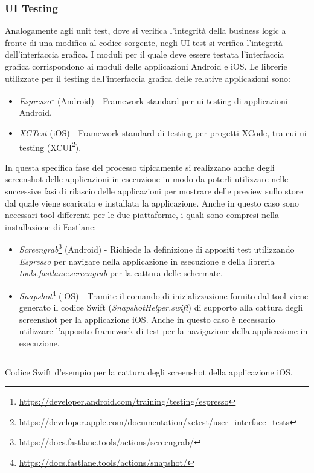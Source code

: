 \subsubsection{UI Testing}
Analogamente agli unit test, dove si verifica l'integrità della business logic a fronte di una modifica al codice sorgente, negli UI test si verifica l'integrità dell'interfaccia grafica. I moduli per il quale deve essere testata l'interfaccia grafica corrispondono ai moduli delle applicazioni Android e iOS. Le librerie utilizzate per il testing dell'interfaccia grafica delle relative applicazioni sono:
\begin{itemize}
    \item \textit{Espresso}\footnote{\url{https://developer.android.com/training/testing/espresso}} (Android) - Framework standard per ui testing di applicazioni Android.
    \item \textit{XCTest} (iOS) - Framework standard di testing per progetti XCode, tra cui ui testing (XCUI\footnote{\url{https://developer.apple.com/documentation/xctest/user_interface_tests}}).
\end{itemize}
In questa specifica fase del processo tipicamente si realizzano anche degli screenshot delle applicazioni in esecuzione in modo da poterli utilizzare nelle successive fasi di rilascio delle applicazioni per mostrare delle preview sullo store dal quale viene scaricata e installata la applicazione. Anche in questo caso sono necessari tool differenti per le due piattaforme, i quali sono compresi nella installazione di Fastlane:
\begin{itemize}
    \item \textit{Screengrab}\footnote{\url{https://docs.fastlane.tools/actions/screengrab/}} (Android) - Richiede la definizione di appositi test utilizzando \textit{Espresso} per navigare nella applicazione in esecuzione e della libreria \textit{tools.fastlane:screengrab} per la cattura delle schermate.
    \item \textit{Snapshot}\footnote{\url{https://docs.fastlane.tools/actions/snapshot/}} (iOS) - Tramite il comando di inizializzazione fornito dal tool viene generato il codice Swift (\textit{SnapshotHelper.swift}) di supporto alla cattura degli screenshot per la applicazione iOS. Anche in questo caso è necessario utilizzare l'apposito framework di test per la navigazione della applicazione in esecuzione.
\end{itemize}

\begin{listing}[H]
\inputminted{swift}{code/4-ios-screenshot}
\caption{Codice Swift d'esempio per la cattura degli screenshot della applicazione iOS.}
\end{listing}

